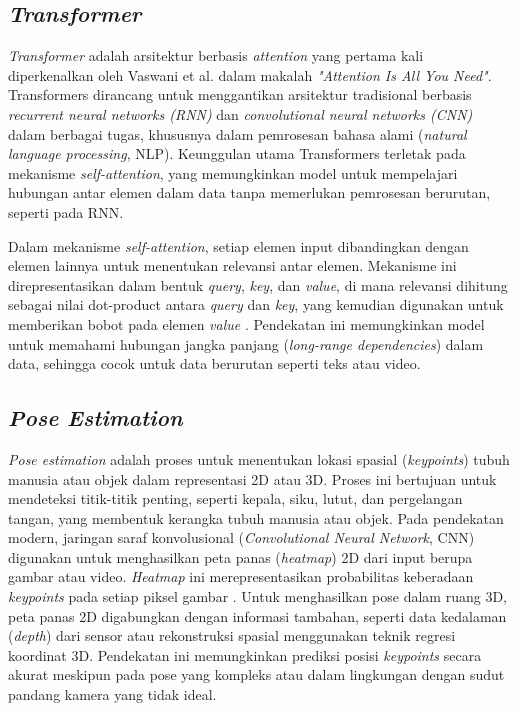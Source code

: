 \subsection{\textit{Transformer}}
\textit{Transformer} adalah arsitektur berbasis \textit{attention} yang pertama kali diperkenalkan oleh Vaswani et al. dalam makalah \textit{"Attention Is All You Need"}. Transformers dirancang untuk menggantikan arsitektur tradisional berbasis \textit{recurrent neural networks (RNN)} dan \textit{convolutional neural networks (CNN)} dalam berbagai tugas, khususnya dalam pemrosesan bahasa alami (\textit{natural language processing}, NLP). Keunggulan utama Transformers terletak pada mekanisme \textit{self-attention}, yang memungkinkan model untuk mempelajari hubungan antar elemen dalam data tanpa memerlukan pemrosesan berurutan, seperti pada RNN.

Dalam mekanisme \textit{self-attention}, setiap elemen input dibandingkan dengan elemen lainnya untuk menentukan relevansi antar elemen. Mekanisme ini direpresentasikan dalam bentuk \textit{query}, \textit{key}, dan \textit{value}, di mana relevansi dihitung sebagai nilai dot-product antara \textit{query} dan \textit{key}, yang kemudian digunakan untuk memberikan bobot pada elemen \textit{value} \cite{vaswani2017attention}. Pendekatan ini memungkinkan model untuk memahami hubungan jangka panjang (\textit{long-range dependencies}) dalam data, sehingga cocok untuk data berurutan seperti teks atau video.

\subsection{\textit{Pose Estimation}}
\textit{Pose estimation} adalah proses untuk menentukan lokasi spasial (\textit{keypoints}) tubuh manusia atau objek dalam representasi 2D atau 3D. Proses ini bertujuan untuk mendeteksi titik-titik penting, seperti kepala, siku, lutut, dan pergelangan tangan, yang membentuk kerangka tubuh manusia atau objek. Pada pendekatan modern, jaringan saraf konvolusional (\textit{Convolutional Neural Network}, CNN) digunakan untuk menghasilkan peta panas (\textit{heatmap}) 2D dari input berupa gambar atau video. \textit{Heatmap} ini merepresentasikan probabilitas keberadaan \textit{keypoints} pada setiap piksel gambar \cite{mehta2017vnect}. Untuk menghasilkan pose dalam ruang 3D, peta panas 2D digabungkan dengan informasi tambahan, seperti data kedalaman (\textit{depth}) dari sensor atau rekonstruksi spasial menggunakan teknik regresi koordinat 3D. Pendekatan ini memungkinkan prediksi posisi \textit{keypoints} secara akurat meskipun pada pose yang kompleks atau dalam lingkungan dengan sudut pandang kamera yang tidak ideal.

